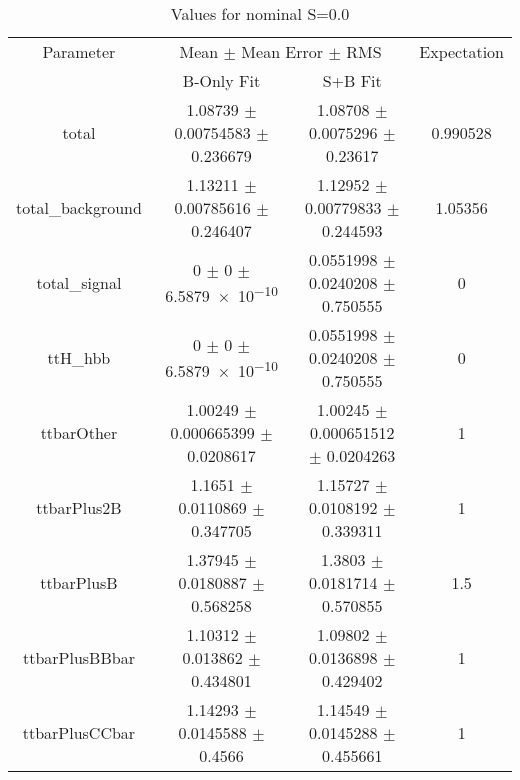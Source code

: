 \begin{table}
\centering
\caption{Values for nominal S=0.0}
\begin{tabular}{cccc}
\toprule
Parameter & \multicolumn{2}{c}{Mean $\pm$ Mean Error $\pm$ RMS} & Expectation\\
 & B-Only Fit & S+B Fit & \\
\midrule
total & \num{1.08739} $\pm$ \num{0.00754583} $\pm$ \num{0.236679} & \num{1.08708} $\pm$ \num{0.0075296} $\pm$ \num{0.23617} & \num{0.990528}\\
total\_background & \num{1.13211} $\pm$ \num{0.00785616} $\pm$ \num{0.246407} & \num{1.12952} $\pm$ \num{0.00779833} $\pm$ \num{0.244593} & \num{1.05356}\\
total\_signal & \num{0} $\pm$ \num{0} $\pm$ \num{6.5879e-10} & \num{0.0551998} $\pm$ \num{0.0240208} $\pm$ \num{0.750555} & \num{0}\\
ttH\_hbb & \num{0} $\pm$ \num{0} $\pm$ \num{6.5879e-10} & \num{0.0551998} $\pm$ \num{0.0240208} $\pm$ \num{0.750555} & \num{0}\\
ttbarOther & \num{1.00249} $\pm$ \num{0.000665399} $\pm$ \num{0.0208617} & \num{1.00245} $\pm$ \num{0.000651512} $\pm$ \num{0.0204263} & \num{1}\\
ttbarPlus2B & \num{1.1651} $\pm$ \num{0.0110869} $\pm$ \num{0.347705} & \num{1.15727} $\pm$ \num{0.0108192} $\pm$ \num{0.339311} & \num{1}\\
ttbarPlusB & \num{1.37945} $\pm$ \num{0.0180887} $\pm$ \num{0.568258} & \num{1.3803} $\pm$ \num{0.0181714} $\pm$ \num{0.570855} & \num{1.5}\\
ttbarPlusBBbar & \num{1.10312} $\pm$ \num{0.013862} $\pm$ \num{0.434801} & \num{1.09802} $\pm$ \num{0.0136898} $\pm$ \num{0.429402} & \num{1}\\
ttbarPlusCCbar & \num{1.14293} $\pm$ \num{0.0145588} $\pm$ \num{0.4566} & \num{1.14549} $\pm$ \num{0.0145288} $\pm$ \num{0.455661} & \num{1}\\
\bottomrule
\end{tabular}
\end{table}